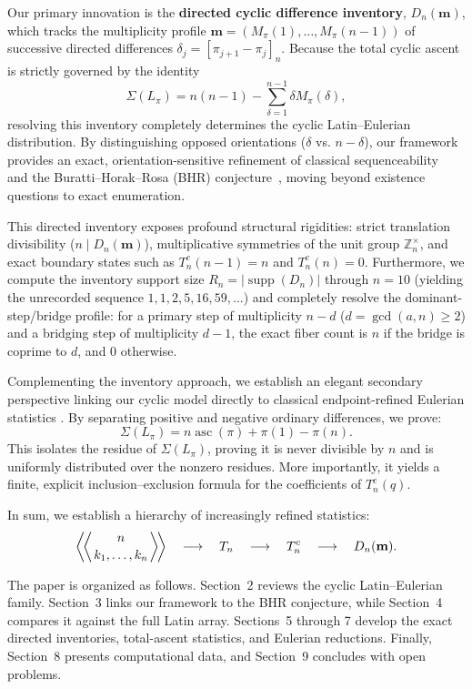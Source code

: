 \documentclass[11pt,a4paper]{amsart}
\newcommand{\1}{\mathbf{1}}
\begin{document}
Our primary innovation is the \textbf{directed cyclic difference inventory}, $D_n(\mathbf{m})$, which tracks the multiplicity profile $\mathbf{m} = (M_\pi(1), \dots, M_\pi(n-1))$ of successive directed differences $\delta_j = [\pi_{j+1} - \pi_j]_n$. Because the total cyclic ascent is strictly governed by the identity
\[
\Sigma(L_\pi) = n(n-1) - \sum_{\delta=1}^{n-1} \delta M_\pi(\delta),
\]
resolving this inventory completely determines the cyclic Latin--Eulerian distribution. By distinguishing opposed orientations ($\delta$ vs. $n-\delta$), our framework provides an exact, orientation-sensitive refinement of classical sequenceability~\cite{Gordon1961,Ollis2025,BakerFeaver2026} and the Buratti--Horak--Rosa (BHR) conjecture~\cite{HorakRosa2009,PasottiPellegrini2014,OllisPasottiPellegriniSchmitt2021,McKayPeters2022}, moving beyond existence questions to exact enumeration. 

This directed inventory exposes profound structural rigidities: strict translation divisibility ($n \mid D_n(\mathbf{m})$), multiplicative symmetries of the unit group $\mathbb{Z}_n^\times$, and exact boundary states such as $T_n^c(n-1)=n$ and $T_n^c(n)=0$. Furthermore, we compute the inventory support size $R_n = |\operatorname{supp}(D_n)|$ through $n=10$ (yielding the unrecorded sequence $1, 1, 2, 5, 16, 59, \dots$) and completely resolve the dominant-step/bridge profile: for a primary step of multiplicity $n-d$ ($d = \gcd(a,n) \ge 2$) and a bridging step of multiplicity $d-1$, the exact fiber count is $n$ if the bridge is coprime to $d$, and $0$ otherwise.

Complementing the inventory approach, we establish an elegant secondary perspective linking our cyclic model directly to classical endpoint-refined Eulerian statistics \cite{Conger2010}. By separating positive and negative ordinary differences, we prove:
\[
\Sigma(L_\pi) = n\operatorname{asc}(\pi) + \pi(1) - \pi(n).
\]
This isolates the residue of $\Sigma(L_\pi)$, proving it is never divisible by $n$ and is uniformly distributed over the nonzero residues. More importantly, it yields a finite, explicit inclusion--exclusion formula for the coefficients of $T_n^c(q)$.

In sum, we establish a hierarchy of increasingly refined statistics:
\[
\left\langle\!\left\langle {n\atop k_1,\ldots,k_n} \right\rangle\!\right\rangle
\quad\longrightarrow\quad
T_n
\quad\longrightarrow\quad
T_n^c
\quad\longrightarrow\quad
D_n(\mathbf{m}).
\]

The paper is organized as follows. Section~2 reviews the cyclic Latin--Eulerian family. Section~3 links our framework to the BHR conjecture, while Section~4 compares it against the full Latin array. Sections~5 through 7 develop the exact directed inventories, total-ascent statistics, and Eulerian reductions. Finally, Section~8 presents computational data, and Section~9 concludes with open problems.
\end{document}
